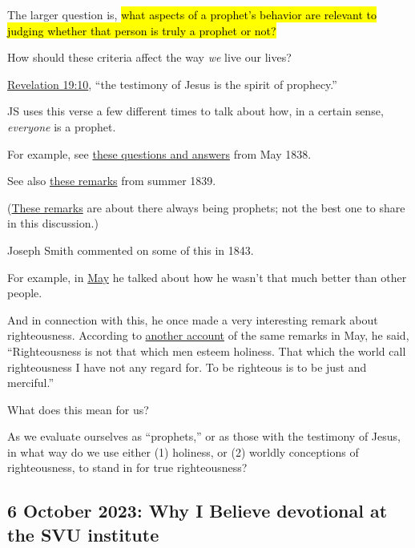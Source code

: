 \begin{compactitem}
			\item The larger question is, \hl{what aspects of a prophet’s behavior are relevant to judging whether that person is truly a prophet or not?}
				\begin{compactitem}
					\item How should these criteria affect the way \textit{we} live our lives? 
						\begin{compactitem}
							\item \hyperref[REVELATION-19-10]{Revelation 19:10}, ``the testimony of Jesus is the spirit of prophecy.''
							\item JS uses this verse a few different times to talk about how, in a certain sense, \textit{everyone} is a prophet.
							\item For example, see \hyperlink{EMS-1838-JS-8-MAY-1838-b}{these questions and answers} from May 1838.
							\item See also \hyperlink{EMS-1839-JS-CIR-26-JUN-CIR-4-AUG-1839-A-i}{these remarks} from summer 1839.
							\item (\hyperlink{EMS-1843-JS-11-JUN-1843-WW-l}{These remarks} are about there always being prophets; not the best one to share in this discussion.)
							\item Joseph Smith commented on some of this in 1843.
							\item For example, in \hyperlink{EMS-1843-JS-21-MAY-1843-WR-b}{May} he talked about how he wasn't that much better than other people.
							\item And in connection with this, he once made a very interesting remark about righteousness. According to \hyperlink{EMS-1843-JS-21-MAY-1843-HC-b}{another account} of the same remarks in May, he said, ``Righteousness is not that which men esteem holiness. That which the world call righteousness I have not any regard for. To be righteous is to be just and merciful.''
							\item What does this mean for us?
							\item As we evaluate ourselves as ``prophets,'' or as those with the testimony of Jesus, in what way do we use either (1) holiness, or (2) worldly conceptions of righteousness, to stand in for true righteousness?
						\end{compactitem}
				\end{compactitem}
		
		\end{compactitem}
	
	\subsection{6 October 2023: Why I Believe devotional at the SVU institute}
		\label{TALKS-06-10-2023}
		
